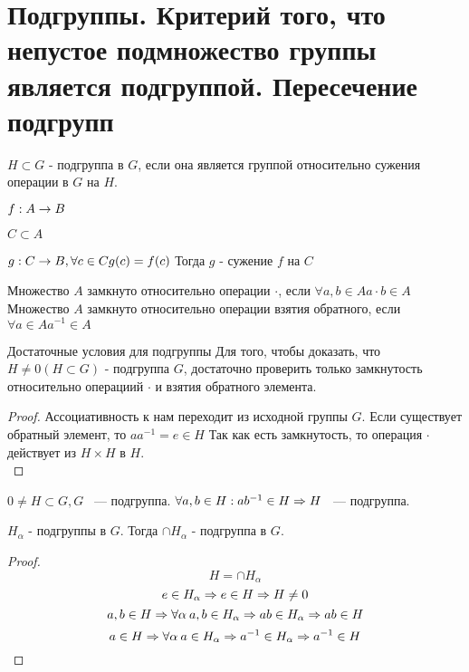 \section{Подгруппы. Критерий того, что непустое подмножество группы является подгруппой. Пересечение подгрупп}
\begin{Def}
	$H \subset G$ - подгруппа в $G$, если она является группой относительно сужения операции в $G$ на $H$. \\
\end{Def}

\begin{Def}
	$f: A \rightarrow B$
	
	$C \subset A$
	
	$g: C \rightarrow B, \forall c \in C g(c) = f(c)$
	Тогда $g$ - сужение $f$ на $C$	\\
\end{Def}

\begin{Def}
	Множество $A$ замкнуто относительно операции $\cdot$, если $\forall a, b \in A a \cdot b \in A$
	Множество $A$ замкнуто относительно операции взятия обратного, если $\forall a \in A a^{-1} \in A$ \\
\end{Def}

\begin{theorem}{Достаточные условия для подгруппы}
Для того, чтобы доказать, что $H \ne 0(H \subset G)$ - подгруппа $G$, достаточно проверить только замкнутость относительно операциий $\cdot$ и взятия обратного элемента. \\
\end{theorem}
\begin{proof}
Ассоциативность к нам переходит из исходной группы $G$.
Если существует обратный элемент, то $a a^{-1} = e \in H$
Так как есть замкнутость, то операция $\cdot$ действует из $H \times H$ в $H$.   \\
\end{proof}

\begin{conseq}
$0 \ne H \subset G, G$ ~--- подгруппа.
$\forall a, b \in H: ab^{-1} \in H \Rightarrow H$ ~--- подгруппа.  
\end{conseq}

\begin{theorem}{}
	$H_\alpha$ - подгруппы в $G$. Тогда $\cap H_\alpha$ - подгруппа в $G$.
\end{theorem}
\begin{proof}
	$$H = \cap H_\alpha$$
	$$e \in H_{\alpha} \Rightarrow e \in H \Rightarrow H \ne 0$$
	$$a, b \in H \Rightarrow \forall \alpha \: a, b \in H_\alpha \Rightarrow ab \in H_\alpha \Rightarrow ab \in H$$
	$$a \in H \Rightarrow \forall \alpha \: a \in H_\alpha \Rightarrow a^{-1} \in H_\alpha \Rightarrow a^{-1} \in H$$
\end{proof}
